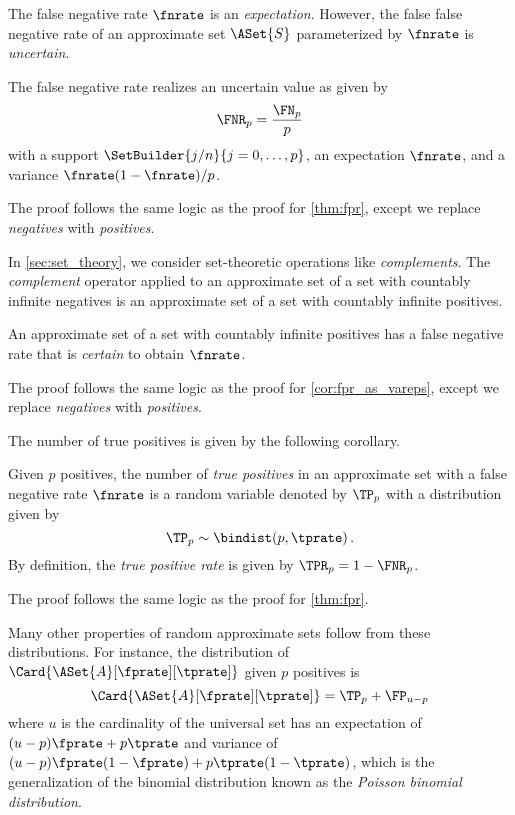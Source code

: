 \documentclass[ ../main.tex]{subfiles}
\begin{document}
The false negative rate $\fnrate$ is an \emph{expectation}.
However, the false false negative rate of an approximate set $\ASet{S}$ parameterized by $\fnrate$ is \emph{uncertain}.
\begin{theorem}
\label{thm:fnr}
The false negative rate realizes an uncertain value as given by
\begin{equation}
    \FNR_p = \frac{\FN_p}{p}
\end{equation}
with a support $\SetBuilder{j / n}{j = 0,\ldots,p}$, an expectation 
$\fnrate$, 
and a variance $\fnrate(1-\fnrate) / p$.
\end{theorem}
The proof follows the same logic as the proof for \cref{thm:fpr}, except we 
replace \emph{negatives} with \emph{positives}.

In \cref{sec:set_theory}, we consider set-theoretic operations like \emph{complements}.
The \emph{complement} operator applied to an approximate set 
of a set with countably infinite negatives is an approximate set of a set with 
countably infinite positives.
\begin{corollary}
An approximate set of a set with countably infinite positives has a false 
negative rate that is \emph{certain} to obtain $\fnrate$.
\end{corollary}
The proof follows the same logic as the proof for \cref{cor:fpr_as_vareps}, 
except we replace \emph{negatives} with \emph{positives}.

The number of true positives is given by the following corollary.
\begin{corollary}
\label{cor:tpbinom}
Given $p$ positives, the number of \emph{true positives} in an approximate set 
with a false negative rate $\fnrate$ is a random variable denoted by $\TP_p$
with a distribution given by 
\begin{equation}
    \TP_p \sim \bindist(p, \tprate)\,.
\end{equation}
By definition, the \emph{true positive rate} is given by $\TPR_p = 1 - 
\FNR_p$.
\end{corollary}
The proof follows the same logic as the proof for \cref{thm:fpr}.

Many other properties of random approximate sets follow from these distributions.
For instance, the distribution of $\Card{\ASet{A}[\fprate][\tprate]}$ given $p$ positives is
\begin{equation}
	\Card{\ASet{A}[\fprate][\tprate]} = \TP_p + \FP_{u - p}
\end{equation}
where $u$ is the cardinality of the universal set has an expectation of $(u - p) \fprate + p \tprate$ and variance of $(u - p) \fprate(1-\fprate) + p \tprate(1-\tprate)$, which is the generalization of the binomial distribution known as the \emph{Poisson binomial distribution}.
\end{document}
